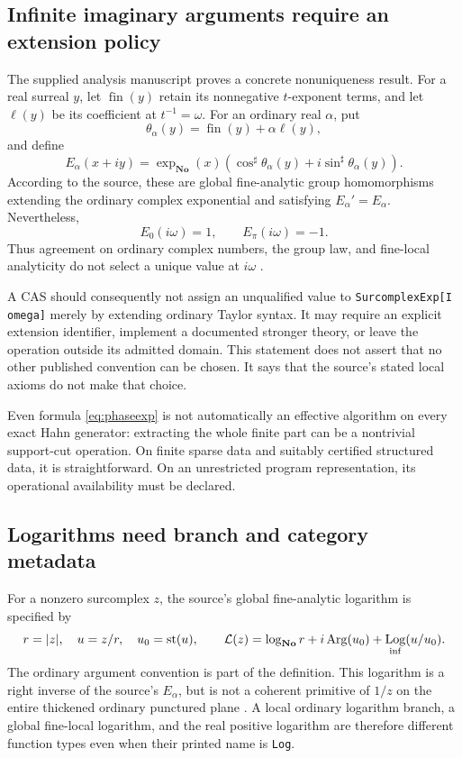\documentclass[11pt,letterpaper]{article}
\numberwithin{equation}{section}
\theoremstyle{definition}
\theoremstyle{remark}\newtheorem{remark}[theorem]{Remark}
\newcommand{\No}{\mathbf{No}}
\newcommand{\st}{\operatorname{st}}
\newcommand{\sh}{^{\sharp}}
\DeclareMathOperator{\Arg}{Arg}
\DeclareMathOperator{\Log}{Log}
\begin{document}
\subsection{Infinite imaginary arguments require an extension policy}
\label{subsec:phase}
The supplied analysis manuscript proves a concrete nonuniqueness result.
For a real surreal $y$, let $\operatorname{fin}(y)$ retain its nonnegative
$t$-exponent terms, and let $\ell(y)$ be its coefficient at $t^{-1}=\omega$.
For an ordinary real $\alpha$, put
\[
 \theta_\alpha(y)=\operatorname{fin}(y)+\alpha\ell(y),
\]
and define
\begin{equation}\label{eq:phaseexp}
 E_\alpha(x+iy)=\exp_{\No}(x)
 \left(\cos\sh\theta_\alpha(y)+i\sin\sh\theta_\alpha(y)\right).
\end{equation}
According to the source, these are global fine-analytic group homomorphisms
extending the ordinary complex exponential and satisfying $E_\alpha'=E_\alpha$.
Nevertheless,
\[
 E_0(i\omega)=1,\qquad E_\pi(i\omega)=-1.
\]
Thus agreement on ordinary complex numbers, the group law, and fine-local
analyticity do not select a unique value at $i\omega$
\cite{SourceAnalysis}.

A CAS should consequently not assign an unqualified value to
\texttt{SurcomplexExp[I omega]} merely by extending ordinary Taylor syntax.
It may require an explicit extension identifier, implement a documented
stronger theory, or leave the operation outside its admitted domain.
This statement does not assert that no other published convention can be
chosen. It says that the source's stated local axioms do not make that choice.

Even formula \eqref{eq:phaseexp} is not automatically an effective algorithm
on every exact Hahn generator: extracting the whole finite part can be a
nontrivial support-cut operation. On finite sparse data and suitably
certified structured data, it is straightforward. On an unrestricted program
representation, its operational availability must be declared.

\subsection{Logarithms need branch and category metadata}
For a nonzero surcomplex $z$, the source's global fine-analytic logarithm is
specified by
\[
 r=|z|,\quad u=z/r,\quad u_0=\st(u),\qquad
 \mathcal L(z)=\log_{\No}r+i\Arg(u_0)+\Log_{\rm inf}(u/u_0).
\]
The ordinary argument convention is part of the definition. This logarithm
is a right inverse of the source's $E_\alpha$, but is not a coherent
primitive of $1/z$ on the entire thickened ordinary punctured plane
\cite{SourceAnalysis}. A local ordinary logarithm branch, a global fine-local
logarithm, and the real positive logarithm are therefore different function
types even when their printed name is \texttt{Log}.
\end{document}
